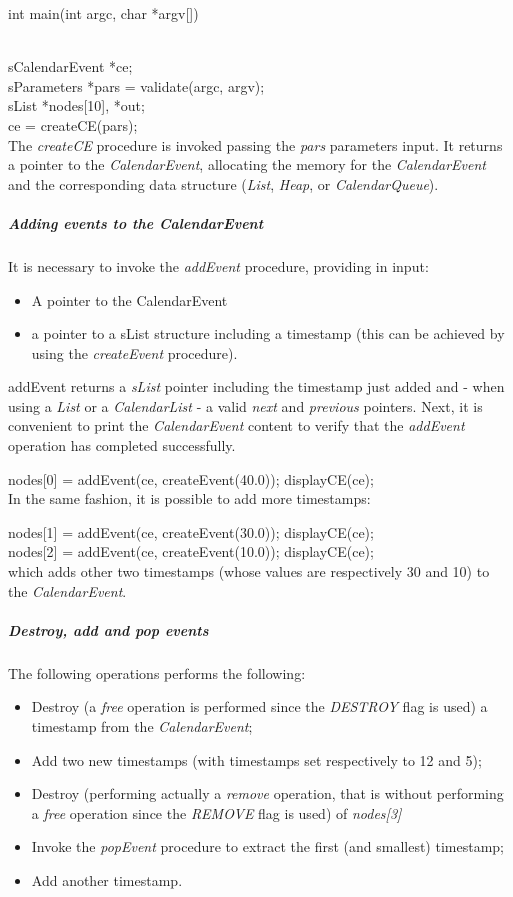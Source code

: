 int main(int argc, char *argv[])\\
{\\
sCalendarEvent *ce;\\
sParameters *pars = validate(argc, argv);\\
sList *nodes[10], *out;\\
ce = createCE(pars);\\

The \textit{createCE} procedure is invoked passing the \textit{pars} parameters input. It returns a pointer to the \textit{CalendarEvent}, allocating the memory for the \textit{CalendarEvent} and 
the corresponding data structure (\textit{List}, \textit{Heap},
or \textit{CalendarQueue}).

\subparagraph{Adding events to the CalendarEvent}

It is necessary to invoke the \textit{addEvent} procedure, providing in input:
\begin{itemize}
\item A pointer to the CalendarEvent
\item a pointer to a sList structure including a timestamp (this can be achieved by using the \textit{createEvent} procedure).
\end{itemize}
addEvent returns a \textit{sList} pointer including the timestamp just added and - when using a \textit{List} or a \textit{CalendarList} - a valid \textit{next} and \textit{previous} pointers.
Next, it is convenient to print the \textit{CalendarEvent} content to verify that the \textit{addEvent} operation has completed successfully.

nodes[0] = addEvent(ce, createEvent(40.0)); 	displayCE(ce);\\

In the same fashion, it is possible to add more timestamps:

nodes[1] = addEvent(ce, createEvent(30.0));	displayCE(ce);\\
nodes[2] = addEvent(ce, createEvent(10.0));	displayCE(ce);\\

which adds other two timestamps (whose values are respectively 30 and 10) to the \textit{CalendarEvent}.

\subparagraph{Destroy, add and pop events}
The following operations performs the following:
\begin{itemize}
\item Destroy (a \textit{free} operation is performed since the \textit{DESTROY} flag is used) a timestamp from the \textit{CalendarEvent};
\item Add two new timestamps (with timestamps set respectively to 12 and 5);
\item Destroy (performing actually a \textit{remove} operation, that is without performing a \textit{free} operation since the \textit{REMOVE} flag is used) of \textit{nodes[3]}
\item Invoke the \textit{popEvent} procedure to extract the first (and smallest) timestamp;
\item Add another timestamp.
\end{itemize}

}
